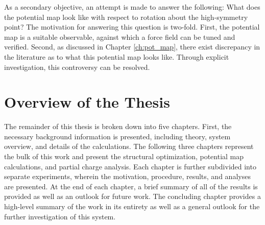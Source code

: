 As a secondary objective, an attempt is made to answer the following: What does the potential map look like with respect to rotation about the high-symmetry point? The motivation for answering this question is two-fold. First, the potential map is a suitable observable, against which a force field can be tuned and verified. Second, as discussed in Chapter \ref{ch:pot_map}, there exist discrepancy in the literature as to what this potential map looks like. Through explicit investigation, this controversy can be resolved.



\section{Overview of the Thesis}
\label{overview}

The remainder of this thesis is broken down into five chapters. First, the necessary background information is presented, including theory, system overview, and details of the calculations. The following three chapters represent the bulk of this work and present the structural optimization, potential map calculations, and partial charge analysis. Each chapter is further subdivided into separate experiments, wherein the motivation, procedure, results, and analyses are presented. At the end of each chapter, a brief summary of all of the results is provided as well as an outlook for future work. The concluding chapter provides a high-level summary of the work in its entirety as well as a general outlook for the further investigation of this system.